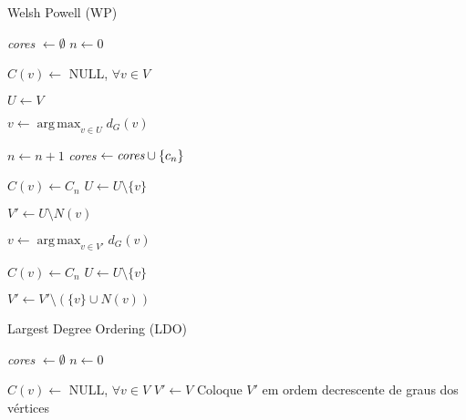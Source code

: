 \documentclass[10pt, twocolumn]{article}
\DeclareMathOperator*{\argmax}{arg\,max}
\begin{document}
\begin{algorithm}
\caption{Welsh Powell (WP)}
\label{alg:wp}


\emph{cores} $\gets \emptyset$\;
$n \gets 0$\;

$C(v) \gets$ NULL, $\forall v \in V$\;

$U \gets V$\;

 {
    $v \gets \argmax_{v \in U} d_G(v)$\;

    $n \gets n + 1$\;
    \emph{cores} $\gets \emph{cores} \cup \{c_n\}$\;

    $C(v) \gets C_n$\;
    $U \gets U \setminus \{v\}$\;

    $V' \gets U \setminus N(v)$\;

     {
        $v \gets \argmax_{v \in V'} d_G(v)$\;
        
        $C(v) \gets C_n$\;
        $U \gets U \setminus \{v\}$\;

        $V' \gets V' \setminus (\{v\} \cup N(v))$\;
    }
}

\;

\end{algorithm}



\begin{algorithm}
\caption{Largest Degree Ordering (LDO)}
\label{alg:ldo}


\emph{cores} $\gets \emptyset$\;
$n \gets 0$\;

$C(v) \gets$ NULL, $\forall v \in V$\;
$V' \gets V$\;
Coloque $V'$ em ordem decrescente de graus dos vértices\;

 {
     {
    }
}
\;

\end{algorithm}


\end{document}
